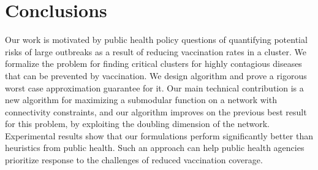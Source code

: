 \section{Conclusions}
Our work is motivated by public health policy questions of quantifying potential risks of large outbreaks as a result
of reducing vaccination rates in a cluster. We formalize the problem \maxcrit{}
for finding critical clusters for highly contagious diseases that can be prevented by vaccination. 
We design algorithm \algomaxcrit{} and prove a rigorous worst case approximation guarantee for it. Our main technical contribution is a new algorithm for maximizing a submodular function on a network with connectivity constraints, and our algorithm improves on the previous best result for this problem, by exploiting the doubling dimension of the network.
Experimental results show that our formulations perform significantly better than heuristics from public health. Such an approach
can help public health agencies prioritize response to the challenges of reduced vaccination
coverage.


